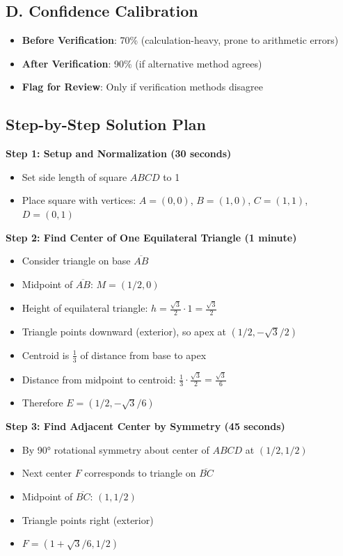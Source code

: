 \documentclass[]{article}
\begin{document}
\begin{verificationbox}
\subsection*{D. Confidence Calibration}
\begin{itemize}[leftmargin=*]
    \item \textbf{Before Verification}: 70\% (calculation-heavy, prone to arithmetic errors)
    \item \textbf{After Verification}: 90\% (if alternative method agrees)
    \item \textbf{Flag for Review}: Only if verification methods disagree
\end{itemize}
\end{verificationbox}

\begin{solutionbox}
\subsection*{Step-by-Step Solution Plan}

\textbf{Step 1: Setup and Normalization (30 seconds)}
\begin{itemize}[leftmargin=*]
    \item Set side length of square $ABCD$ to 1
    \item Place square with vertices: $A=(0,0)$, $B=(1,0)$, $C=(1,1)$, $D=(0,1)$
\end{itemize}

\textbf{Step 2: Find Center of One Equilateral Triangle (1 minute)}
\begin{itemize}[leftmargin=*]
    \item Consider triangle on base $\overline{AB}$
    \item Midpoint of $\overline{AB}$: $M = (1/2, 0)$
    \item Height of equilateral triangle: $h = \frac{\sqrt{3}}{2} \cdot 1 = \frac{\sqrt{3}}{2}$
    \item Triangle points downward (exterior), so apex at $(1/2, -\sqrt{3}/2)$
    \item Centroid is $\frac{1}{3}$ of distance from base to apex
    \item Distance from midpoint to centroid: $\frac{1}{3} \cdot \frac{\sqrt{3}}{2} = \frac{\sqrt{3}}{6}$
    \item Therefore $E = (1/2, -\sqrt{3}/6)$
\end{itemize}

\textbf{Step 3: Find Adjacent Center by Symmetry (45 seconds)}
\begin{itemize}[leftmargin=*]
    \item By 90° rotational symmetry about center of $ABCD$ at $(1/2, 1/2)$
    \item Next center $F$ corresponds to triangle on $\overline{BC}$
    \item Midpoint of $\overline{BC}$: $(1, 1/2)$
    \item Triangle points right (exterior)
    \item $F = (1 + \sqrt{3}/6, 1/2)$
\end{itemize}


\end{solutionbox}
\end{document}
